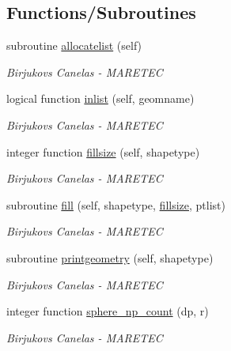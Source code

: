 \subsection*{Functions/\+Subroutines}
\begin{DoxyCompactItemize}
\item 
subroutine \hyperlink{namespacegeometry__mod_a1b6f259b0b6be71e02ffae7670f7d8ba}{allocatelist} (self)
\begin{DoxyCompactList}\small\item\em Birjukovs Canelas -\/ M\+A\+R\+E\+T\+EC \end{DoxyCompactList}\item 
logical function \hyperlink{namespacegeometry__mod_a22dd77024fce56da299445a697256155}{inlist} (self, geomname)
\begin{DoxyCompactList}\small\item\em Birjukovs Canelas -\/ M\+A\+R\+E\+T\+EC \end{DoxyCompactList}\item 
integer function \hyperlink{namespacegeometry__mod_a92602e1198d3607613ea2722fb002685}{fillsize} (self, shapetype)
\begin{DoxyCompactList}\small\item\em Birjukovs Canelas -\/ M\+A\+R\+E\+T\+EC \end{DoxyCompactList}\item 
subroutine \hyperlink{namespacegeometry__mod_a095a8b47b3c23e154dcd31ab1441a065}{fill} (self, shapetype, \hyperlink{namespacegeometry__mod_a92602e1198d3607613ea2722fb002685}{fillsize}, ptlist)
\begin{DoxyCompactList}\small\item\em Birjukovs Canelas -\/ M\+A\+R\+E\+T\+EC \end{DoxyCompactList}\item 
subroutine \hyperlink{namespacegeometry__mod_aed4426181ca851b41717edd50268e5f3}{printgeometry} (self, shapetype)
\begin{DoxyCompactList}\small\item\em Birjukovs Canelas -\/ M\+A\+R\+E\+T\+EC \end{DoxyCompactList}\item 
integer function \hyperlink{namespacegeometry__mod_a05de7940b4e7df5a2b31f3d0414e3743}{sphere\+\_\+np\+\_\+count} (dp, r)
\begin{DoxyCompactList}\small\item\em Birjukovs Canelas -\/ M\+A\+R\+E\+T\+EC \end{DoxyCompactList}\item 

\end{DoxyCompactItemize}
